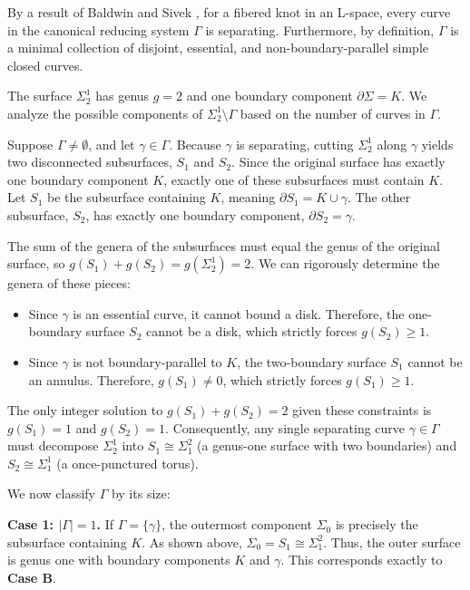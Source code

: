 \begin{myproof}
    By a result of Baldwin and Sivek \cite{BaldwinSivekInPrep}, for a fibered knot in an L-space, every curve in the canonical reducing system $\Gamma$ is separating. Furthermore, by definition, $\Gamma$ is a minimal collection of disjoint, essential, and non-boundary-parallel simple closed curves.

    The surface $\Sigma_2^1$ has genus $g=2$ and one boundary component $\partial \Sigma = K$. We analyze the possible components of $\Sigma_2^1 \setminus \Gamma$ based on the number of curves in $\Gamma$.

    Suppose $\Gamma \neq \emptyset$, and let $\gamma \in \Gamma$. Because $\gamma$ is separating, cutting $\Sigma_2^1$ along $\gamma$ yields two disconnected subsurfaces, $S_1$ and $S_2$. Since the original surface has exactly one boundary component $K$, exactly one of these subsurfaces must contain $K$. Let $S_1$ be the subsurface containing $K$, meaning $\partial S_1 = K \cup \gamma$. The other subsurface, $S_2$, has exactly one boundary component, $\partial S_2 = \gamma$.

    The sum of the genera of the subsurfaces must equal the genus of the original surface, so $g(S_1) + g(S_2) = g(\Sigma_2^1) = 2$. We can rigorously determine the genera of these pieces:
    \begin{itemize}
        \item Since $\gamma$ is an essential curve, it cannot bound a disk. Therefore, the one-boundary surface $S_2$ cannot be a disk, which strictly forces $g(S_2) \geq 1$.
        \item Since $\gamma$ is not boundary-parallel to $K$, the two-boundary surface $S_1$ cannot be an annulus. Therefore, $g(S_1) \neq 0$, which strictly forces $g(S_1) \geq 1$.
    \end{itemize}
    The only integer solution to $g(S_1) + g(S_2) = 2$ given these constraints is $g(S_1) = 1$ and $g(S_2) = 1$. Consequently, any single separating curve $\gamma \in \Gamma$ must decompose $\Sigma_2^1$ into $S_1 \cong \Sigma_1^2$ (a genus-one surface with two boundaries) and $S_2 \cong \Sigma_1^1$ (a once-punctured torus).

    We now classify $\Gamma$ by its size:

    \textbf{Case 1: $|\Gamma| = 1$.}
    If $\Gamma = \{\gamma\}$, the outermost component $\Sigma_0$ is precisely the subsurface containing $K$. As shown above, $\Sigma_0 = S_1 \cong \Sigma_1^2$. Thus, the outer surface is genus one with boundary components $K$ and $\gamma$. This corresponds exactly to \textbf{Case B}.


\end{myproof}
